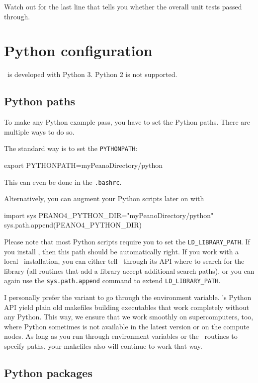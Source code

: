 \noindent
Watch out for the last line that tells you whether the overall unit tests passed
through.

\section{Python configuration}

\Peano\ is developed with Python 3. Python 2 is not supported. 


\subsection{Python paths}
To make any Python example pass, you have to set the Python paths.
There are multiple ways to do so.

The standard way is to set the \texttt{PYTHONPATH}:
\begin{code}
export PYTHONPATH=myPeanoDirectory/python
\end{code}
This can even be done in the \texttt{.bashrc}.

Alternatively, you can augment your Python scripts later on with 
\begin{code}
import sys
PEANO4_PYTHON_DIR="myPeanoDirectory/python"
sys.path.append(PEANO4_PYTHON_DIR)
\end{code}


\noindent
Please note that most Python scripts require you to set the
\texttt{LD\_LIBRARY\_PATH}. 
If you install \Peano, then this path should be automatically right.
If you work with a local \Peano\ installation, you can either tell \Peano\
through its API where to search for the library (all routines that add a
library accept additional search paths), or you can again use the
\texttt{sys.path.append} command to extend \texttt{LD\_LIBRARY\_PATH}.


\begin{remark}
 I personally prefer the variant to go through the environment variable.
 \Peano's Python API yield plain old makefiles building executables that work
 completely without any Python. 
 This way, we ensure that we work smoothly on supercomputers, too, where Python
 sometimes is not available in the latest version or on the compute nodes.
 As long as you run through environment variables or the \Peano\ routines to
 specify paths, your makefiles also will continue to work that way. 
\end{remark}


\subsection{Python packages}

